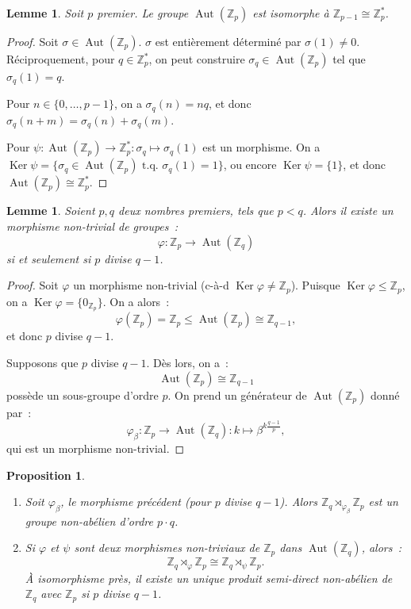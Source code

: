 \documentclass{article}
\newtheorem{prp}[thm]{Proposition}
\newtheorem{lem}[thm]{Lemme}
\theoremstyle{definition}
\theoremstyle{remark}
\DeclareMathOperator{\Ker}{Ker}
\DeclareMathOperator{\Aut}{Aut}
\newcommand{\Z}{\mathbb Z}
\newcommand{\tq}{\text{ t.q. }}
\newcommand{\proofright}{{\framebox[1.5\width]{$\Rightarrow$}\hspace{.1cm}}}
\newcommand{\proofleft}{{\framebox[1.5\width]{$\Leftarrow$}\hspace{.1cm}}}
\newcommand{\simeqq}{\cong}
\begin{document}

		\begin{lem} Soit $p$ premier. Le groupe $\Aut(\Z_p)$ est isomorphe à $\Z_{p-1} \simeqq \Z_p^*$.
		\end{lem}

		\begin{proof} Soit $\sigma \in \Aut(\Z_p)$. $\sigma$ est entièrement déterminé par $\sigma(1) \neq 0$. Réciproquement, pour $q \in \Z_p^*$,
		on peut construire $\sigma_q \in \Aut(\Z_p)$ tel que $\sigma_q(1) = q$.

		Pour $n \in \{0, \ldots, p-1\}$, on a $\sigma_q(n) = nq$, et donc $\sigma_q(n+m) = \sigma_q(n) + \sigma_q(m)$.

		Pour $\psi : \Aut(\Z_p) \to \Z_p^* : \sigma_q \mapsto \sigma_q(1)$ est un morphisme. On a $\Ker \psi = \{\sigma_q \in \Aut(\Z_p) \tq \sigma_q(1) = 1\}$,
		ou encore $\Ker \psi = \{1\}$, et donc $\Aut(\Z_p) \simeqq \Z_p^*$.
		\end{proof}

		\begin{lem} Soient $p, q$ deux nombres premiers, tels que $p < q$. Alors il existe un morphisme non-trivial de groupes~:
		\[\varphi : \Z_p \to \Aut(\Z_q)\]
		si et seulement si $p$ divise $q-1$.
		\end{lem}

		\begin{proof} \proofright Soit $\varphi$ un morphisme non-trivial (c-à-d $\Ker \varphi \neq \Z_p$). Puisque $\Ker \varphi \leq \Z_p$, on a $\Ker\varphi
		= \{0_{\Z_p}\}$. On a alors~:
		\[\varphi\left(\Z_p\right) = \Z_p \leq \Aut(\Z_p) \simeqq \Z_{q-1},\]
		et donc $p$ divise $q-1$.

		\proofleft Supposons que $p$ divise $q-1$. Dès lors, on a~:
		\[\Aut(\Z_p) \simeqq \Z_{q-1}\]
		possède un sous-groupe d'ordre $p$. On prend un générateur de $\Aut(\Z_p)$ donné par~:
		\[\varphi_\beta : \Z_p \to \Aut(\Z_q) : k \mapsto \beta^{k\frac {q-1}p},\]
		qui est un morphisme non-trivial.
		\end{proof}

		\begin{prp}~
		\begin{enumerate}
			\item Soit $\varphi_\beta$, le morphisme précédent (pour $p$ divise $q-1$). Alors $\Z_q \rtimes_{\varphi_\beta} \Z_p$ est un groupe non-abélien
			d'ordre $p \cdot q$.

			\item Si $\varphi$ et $\psi$ sont deux morphismes non-triviaux de $\Z_p$ dans $\Aut(\Z_q)$, alors~:
			\[\Z_q \rtimes_\varphi \Z_p \simeqq \Z_q \rtimes_\psi \Z_p.\]
			À isomorphisme près, il existe un unique produit semi-direct non-abélien de $\Z_q$ avec $\Z_p$ si $p$ divise $q-1$.
		\end{enumerate}
		\end{prp}
\end{document}
